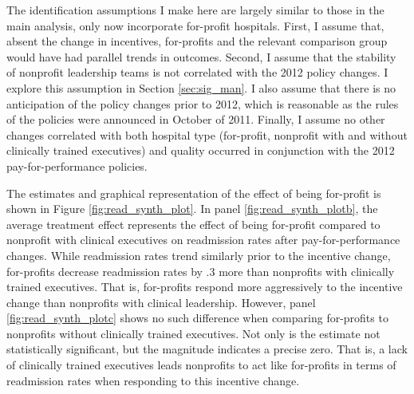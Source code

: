 \documentclass[12pt]{article}
\begin{document}
    The identification assumptions I make here are largely similar to those in the main analysis, only now incorporate for-profit hospitals. First, I assume that, absent the change in incentives, for-profits and the relevant comparison group would have had parallel trends in outcomes. Second, I assume that the stability of nonprofit leadership teams is not correlated with the 2012 policy changes. I explore this assumption in Section \ref{sec:sig_man}. I also assume that there is no anticipation of the policy changes prior to 2012, which is reasonable as the rules of the policies were announced in October of 2011. Finally, I assume no other changes correlated with both hospital type (for-profit, nonprofit with and without clinically trained executives) and quality occurred in conjunction with the 2012 pay-for-performance policies.

    The estimates and graphical representation of the effect of being for-profit is shown in Figure \ref{fig:read_synth_plot}. In panel \ref{fig:read_synth_plotb}, the average treatment effect represents the effect of being for-profit compared to nonprofit with clinical executives on readmission rates after pay-for-performance changes. While readmission rates trend similarly prior to the incentive change, for-profits decrease readmission rates by .3 more than nonprofits with clinically trained executives. That is, for-profits respond more aggressively to the incentive change than nonprofits with clinical leadership. However, panel \ref{fig:read_synth_plotc} shows no such difference when comparing for-profits to nonprofits without clinically trained executives. Not only is the estimate not statistically significant, but the magnitude indicates a precise zero. That is, a lack of clinically trained executives leads nonprofits to act like for-profits in terms of readmission rates when responding to this incentive change. 
\end{document}
